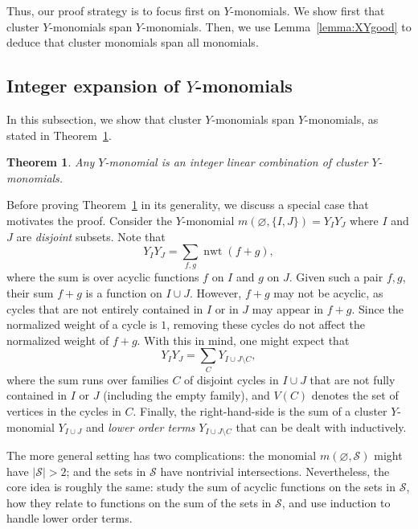 \documentclass[11pt]{article}
\newtheorem{theo}{Theorem}[section]
\theoremstyle{definition}
\numberwithin{equation}{section}
\DeclareMathOperator{\normalizedweight}{nwt}
\newcommand{\monomial}[2]{m(#1, #2)}
\begin{document}
Thus, our proof strategy is to focus first on \(Y\)-monomials. We show first that cluster \(Y\)-monomials span \(Y\)-monomials. Then, we use Lemma~\ref{lemma:XYgood} to deduce that cluster monomials span all monomials. 

\subsection{Integer expansion of \texorpdfstring{\(Y\)}{Y}-monomials} \label{subsection:Ymonomialsspanning}

In this subsection, we show that cluster \(Y\)-monomials span \(Y\)-monomials, as stated in Theorem~\ref{theorem:Yclusters-span}.

\begin{theo} \label{theorem:Yclusters-span}
    Any \(Y\)-monomial is an integer linear combination of cluster \(Y\)-monomials.
\end{theo}

Before proving Theorem~\ref{theorem:Yclusters-span} in its generality,
we discuss a special case that motivates the proof.
Consider the \(Y\)-monomial \(\monomial{\varnothing}{\{I, J\}} = Y_I Y_J\)
where \(I\) and \(J\) are \emph{disjoint} subsets.
Note that 
\begin{equation*}
    Y_I Y_J = \sum_{f, g} \normalizedweight(f + g),
\end{equation*}
where the sum is over acyclic functions \(f\) on \(I\) and \(g\) on \(J\).
Given such a pair \(f, g\), their sum \(f + g\) is a function on \(I \cup J\).
However, \(f + g\) may not be acyclic,
as cycles that are not entirely contained in \(I\) or in \(J\) may appear in \(f + g\).
Since the normalized weight of a cycle is \(1\),
removing these cycles do not affect the normalized weight of \(f + g\).
With this in mind, one might expect that
\begin{equation*}
    Y_I Y_J = \sum_{C} Y_{I \cup J \setminus C},
\end{equation*}
where the sum runs over families \(C\) of disjoint cycles in \(I \cup J\)
that are not fully contained in \(I\) or \(J\) (including the empty family),
and \(V(C)\) denotes the set of vertices in the cycles in \(C\).
Finally, the right-hand-side is the sum of a cluster \(Y\)-monomial \(Y_{I \cup J}\)
and \emph{lower order terms} \(Y_{I \cup J \setminus C}\) that can be dealt with inductively.

The more general setting has two complications:
the monomial \(\monomial{\varnothing}{\mathcal{S}}\) might have \(|\mathcal{S}| > 2\);
and the sets in \(\mathcal{S}\) have nontrivial intersections.
Nevertheless, the core idea is roughly the same:
study the sum of acyclic functions on the sets in \(\mathcal{S}\),
how they relate to functions on the sum of the sets in \(\mathcal{S}\),
and use induction to handle lower order terms.
\end{document}
